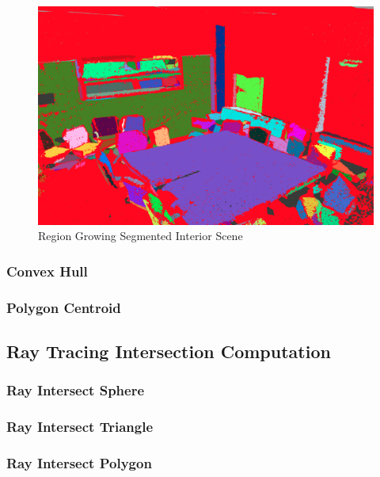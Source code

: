 \documentclass[11pt, a4paper,oneside,chapterprefix=false]{scrbook}
\begin{document}
\noindent
\begin{minipage}{\textwidth}
	\begin{figure}[H]
		\includegraphics*[width=1.0\textwidth]{figures/rg.png}
		\caption{Region Growing Segmented Interior Scene}
		\label{fig:region growing segmented interior scene}
	\end{figure}
\end{minipage}

\subsubsection{Convex Hull}

\subsubsection{Polygon Centroid}

\subsection{Ray Tracing Intersection Computation} \label{sec:ray tracing}

\subsubsection{Ray Intersect Sphere}

\subsubsection{Ray Intersect Triangle}

\subsubsection{Ray Intersect Polygon}
\end{document}
